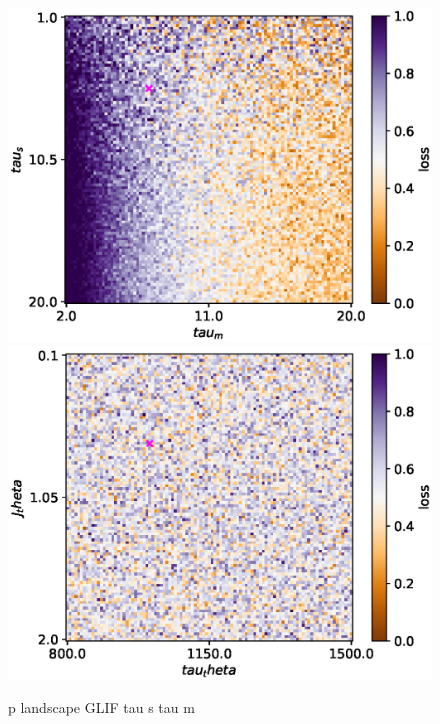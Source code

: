 \documentclass[mphil,deptreport,ianc]{infthesis} %
\begin{document}
\begin{figure}
    \centering
    \vskip -0.1in
    \includegraphics[width=0.9\columnwidth]{figures/param_landscape_heatmaps/microGIF/test_export_2d_heatmap_N_4_loss_tau_m_tau_s.eps}
    \includegraphics[width=0.9\columnwidth]{figures/param_landscape_heatmaps/microGIF/test_export_2d_heatmap_N_4_loss_tau_theta_J_theta.eps}
    \vskip -0.1in
    \caption{p landscape GLIF tau s tau m}
    \vskip -0.2in
\end{figure}
\end{document}
